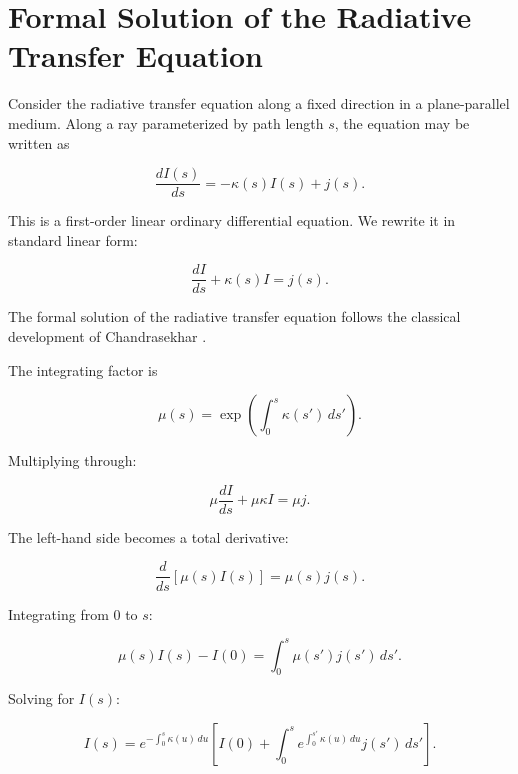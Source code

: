 \section{Formal Solution of the Radiative Transfer Equation}

Consider the radiative transfer equation along a fixed direction in a plane-parallel medium. 
Along a ray parameterized by path length $s$, the equation may be written as

\begin{equation}
\frac{dI(s)}{ds} = -\kappa(s) I(s) + j(s).
\end{equation}

This is a first-order linear ordinary differential equation. 
We rewrite it in standard linear form:

\begin{equation}
\frac{dI}{ds} + \kappa(s) I = j(s).
\end{equation}

The formal solution of the radiative transfer equation follows the classical development of Chandrasekhar \cite{chandrasekhar1960}.

The integrating factor is

\begin{equation}
\mu(s) = \exp\left( \int_0^s \kappa(s') \, ds' \right).
\end{equation}

Multiplying through:

\begin{equation}
\mu \frac{dI}{ds} + \mu \kappa I = \mu j.
\end{equation}

The left-hand side becomes a total derivative:

\begin{equation}
\frac{d}{ds} \left[ \mu(s) I(s) \right] = \mu(s) j(s).
\end{equation}

Integrating from $0$ to $s$:

\begin{equation}
\mu(s) I(s) - I(0) = \int_0^s \mu(s') j(s') \, ds'.
\end{equation}

Solving for $I(s)$:

\begin{equation}
I(s) = e^{-\int_0^s \kappa(u)\,du}
\left[
I(0) + \int_0^s e^{\int_0^{s'} \kappa(u)\,du} j(s')\, ds'
\right].
\end{equation}